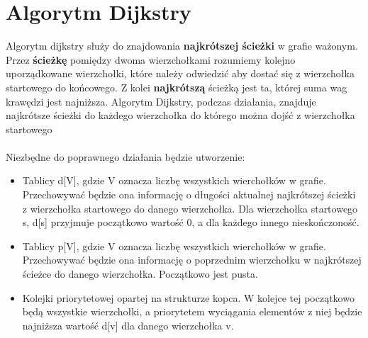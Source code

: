 \documentclass{article}
\begin{document}
\section{Algorytm Dijkstry}
Algorytm dijkstry służy do znajdowania  \textbf{najkrótszej ścieżki} w grafie ważonym. Przez \textbf{ścieżkę} pomiędzy dwoma wierzchołkami rozumiemy kolejno uporządkowane wierzchołki, które należy odwiedzić aby dostać się z wierzchołka startowego do końcowego. Z kolei \textbf{najkrótszą} ścieżką jest ta, której suma wag krawędzi jest najniższa. Algorytm Dijkstry, podczas działania, znajduje najkrótsze ścieżki do każdego wierzchołka do którego można dojść z wierzchołka startowego
\\ \\
Niezbędne do poprawnego działania będzie utworzenie:
\begin {itemize}

\item Tablicy d[V], gdzie V oznacza liczbę wszystkich wierchołków w grafie. Przechowywać będzie ona informację o długości aktualnej najkrótszej ścieżki z wierzchołka startowego do danego wierzchołka. Dla wierzchołka startowego s, d[s] przyjmuje początkowo wartość 0, a dla każdego innego nieskończoność.
\item Tablicy p[V], gdzie V oznacza liczbę wszystkich wierchołków w grafie. Przechowywać będzie ona informację o poprzednim wierzchołku w najkrótszej ścieżce do danego wierzchołka. Początkowo jest pusta.
\item Kolejki priorytetowej opartej na strukturze kopca. W kolejce tej początkowo będą wszystkie wierzchołki, a priorytetem wyciągania elementów z niej będzie najniższa wartość d[v] dla danego wierzchołka v.\\

\end{itemize}
\end{document}
